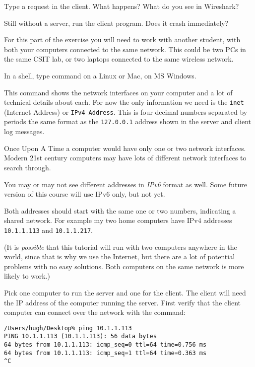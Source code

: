 Type a request in the client. What happens? What do you see in Wireshark?

Still without a server, run the client program. Does it crash immediately?



For this part of the exercise you will need to work with another student, with both your
computers connected to the same network. This could be two PCs in the same CSIT lab, or
two laptops connected to the same wireless network.

In a shell, type command  on a Linux or Mac,  on MS Windows.

This command shows the network interfaces on your computer and a lot of technical details
about each. For now the only information we need is the \texttt{inet} (Internet Address)
or \texttt{IPv4 Address}. This is four decimal numbers separated by periods \DSH the same
format as the \texttt{127.0.0.1} address shown in the server and client log messages.

\begin{IMPORTANT}
Once Upon A Time a computer would have only one or two network interfaces. Modern 21st
century computers may have lots of different network interfaces to search through.

You may or may not see different addresses in \emph{IPv6} format as well. Some future version
of this course will use IPv6 only, but not yet.
\end{IMPORTANT}

Both addresses should start with the same one or two numbers, indicating a shared network.
For example my two home computers have IPv4 addresses \texttt{10.1.1.113}
and \texttt{10.1.1.217}.

(It is \emph{possible} that this tutorial will run with two computers anywhere in the world,
since that is why we use the Internet, but there are a lot of potential problems
with no easy solutions. Both computers on the same network is more likely to work.)

Pick one computer to run the server and one for the client. The client will need the IP
address of the computer running the server. First verify that the client computer can
connect over the network with the  command:

\begin{CODE}\begin{verbatim}
/Users/hugh/Desktop% ping 10.1.1.113
PING 10.1.1.113 (10.1.1.113): 56 data bytes
64 bytes from 10.1.1.113: icmp_seq=0 ttl=64 time=0.756 ms
64 bytes from 10.1.1.113: icmp_seq=1 ttl=64 time=0.363 ms
^C
\end{verbatim}\end{CODE}

